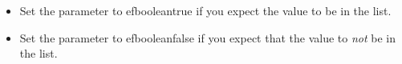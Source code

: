 \begin{itemize}
\item Set the parameter to \jb{}efbooleantrue{} if you expect the value to be in the list. 
\item Set the parameter to \jb{}efbooleanfalse{} if you expect that the value to \emph{not} be in the list.
\end{itemize}

    